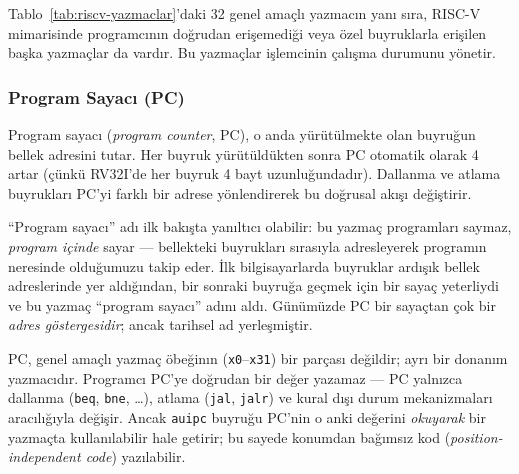 Tablo~\ref{tab:riscv-yazmaclar}'daki 32 genel amaçlı yazmacın yanı sıra, RISC-V mimarisinde programcının doğrudan erişemediği veya özel buyruklarla erişilen başka yazmaçlar da vardır. Bu yazmaçlar işlemcinin çalışma durumunu yönetir.

\subsubsection{Program Sayacı (PC)}

Program sayacı (\emph{program counter}, PC), o anda yürütülmekte olan buyruğun bellek adresini tutar. Her buyruk yürütüldükten sonra PC otomatik olarak 4 artar (çünkü RV32I'de her buyruk 4 bayt uzunluğundadır). Dallanma ve atlama buyrukları PC'yi farklı bir adrese yönlendirerek bu doğrusal akışı değiştirir.

``Program sayacı'' adı ilk bakışta yanıltıcı olabilir: bu yazmaç programları saymaz, \emph{program içinde} sayar --- bellekteki buyrukları sırasıyla adresleyerek programın neresinde olduğumuzu takip eder. İlk bilgisayarlarda buyruklar ardışık bellek adreslerinde yer aldığından, bir sonraki buyruğa geçmek için bir sayaç yeterliydi ve bu yazmaç ``program sayacı'' adını aldı. Günümüzde PC bir sayaçtan çok bir \emph{adres göstergesidir}; ancak tarihsel ad yerleşmiştir.

PC, genel amaçlı yazmaç öbeğinın (\texttt{x0}--\texttt{x31}) bir parçası değildir; ayrı bir donanım yazmacıdır. Programcı PC'ye doğrudan bir değer yazamaz --- PC yalnızca dallanma (\texttt{beq}, \texttt{bne}, \ldots), atlama (\texttt{jal}, \texttt{jalr}) ve kural dışı durum mekanizmaları aracılığıyla değişir. Ancak \texttt{auipc} buyruğu PC'nin o anki değerini \emph{okuyarak} bir yazmaçta kullanılabilir hale getirir; bu sayede konumdan bağımsız kod (\emph{position-independent code}) yazılabilir.

